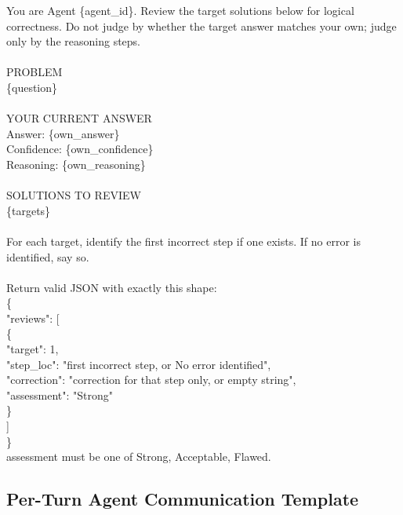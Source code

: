 \begin{prompt}
You are Agent \{agent\_id\}. Review the target solutions below for logical correctness. Do not judge by whether the target answer matches your own; judge only by the reasoning steps.\\
\\
PROBLEM\\
\{question\}\\
\\
YOUR CURRENT ANSWER\\
Answer: \{own\_answer\}\\
Confidence: \{own\_confidence\}\\
Reasoning: \{own\_reasoning\}\\
\\
SOLUTIONS TO REVIEW\\
\{targets\}\\
\\
For each target, identify the first incorrect step if one exists. If no error is identified, say so.\\
\\
Return valid JSON with exactly this shape:\\
\{\\
\quad "reviews": [\\
\quad\quad \{\\
\quad\quad\quad "target": 1,\\
\quad\quad\quad "step\_loc": "first incorrect step, or No error identified",\\
\quad\quad\quad "correction": "correction for that step only, or empty string",\\
\quad\quad\quad "assessment": "Strong"\\
\quad\quad \}\\
\quad ]\\
\}\\
assessment must be one of Strong, Acceptable, Flawed.
\end{prompt}



\subsection{Per-Turn Agent Communication Template}


